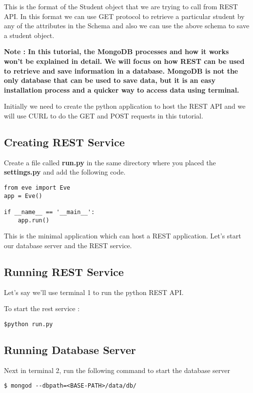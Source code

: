 \documentclass{article}
\begin{document}
This is the format of the Student object that we are trying to call from REST API. In this format we can use GET protocol to retrieve a particular student by any of the attributes in the Schema and also we can use the above schema to save a student object. 
\newline

\textbf{Note : In this tutorial, the MongoDB processes and how it works won't be explained in detail. We will focus on how REST can be used to retrieve and save information in a database. MongoDB is not the only database that can be used to save data, but it is an easy installation process and a quicker way to access data using terminal. 
}
\newline

Initially we need to create the python application to host the REST API and we will use CURL to do the GET and POST requests in this tutorial. 

\subsection{Creating REST Service}

Create a file called \textbf{run.py} in the same directory where you placed the \textbf{settings.py} and add the following code. 

\begin{verbatim}
from eve import Eve
app = Eve()

if __name__ == '__main__':
    app.run()
\end{verbatim}

This is the minimal application which can host a REST application. Let's start our database server and the REST service.

\subsection{Running REST Service}

Let's say we'll use terminal 1 to run the python REST API.

To start the rest service :
\begin{verbatim}
$python run.py
\end{verbatim}

\subsection{Running Database Server}

Next in terminal 2, run the following command to start the database server
\begin{verbatim}
$ mongod --dbpath=<BASE-PATH>/data/db/
\end{verbatim}
\end{document}
